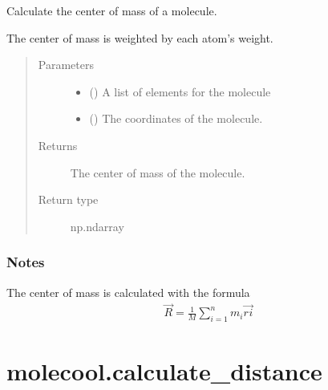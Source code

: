 \documentclass[letterpaper,10pt,english]{sphinxmanual}
\begin{document}
\begin{fulllineitems}
\label{\detokenize{autosummary/molecool.calculate_center_of_mass:molecool.calculate_center_of_mass}}
Calculate the center of mass of a molecule.

The center of mass is weighted by each atom’s weight.
\begin{quote}\begin{description}
\item[{Parameters}] \leavevmode\begin{itemize}
\item {} 
 () \textendash{} A list of elements for the molecule

\item {} 
 () \textendash{} The coordinates of the molecule.

\end{itemize}

\item[{Returns}] \leavevmode
{} \textendash{} The center of mass of the molecule.

\item[{Return type}] \leavevmode
np.ndarray

\end{description}\end{quote}
\subsubsection*{Notes}

The center of mass is calculated with the formula
\begin{equation*}
\begin{split}\vec{R}=\frac{1}{M} \sum_{i=1}^{n} m_{i}\vec{r_{}i}\end{split}
\end{equation*}
\end{fulllineitems}



\section{molecool.calculate\_distance}
\label{\detokenize{autosummary/molecool.calculate_distance:molecool-calculate-distance}}\label{\detokenize{autosummary/molecool.calculate_distance::doc}}
\end{document}
